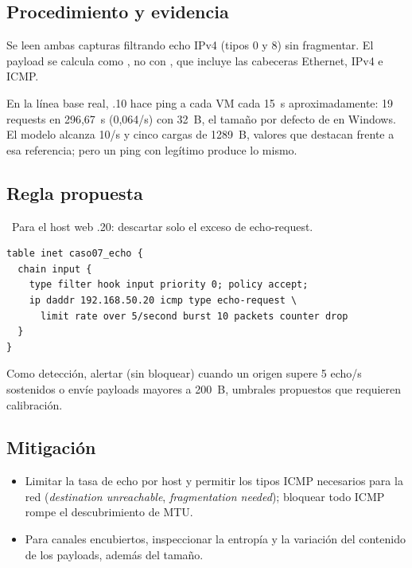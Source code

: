 \subsection{Procedimiento y evidencia}
Se leen ambas capturas filtrando echo IPv4 (tipos 0 y 8) sin fragmentar. El payload se calcula como , no con , que incluye las cabeceras Ethernet, IPv4 e ICMP.


En la línea base real, .10 hace ping a cada VM cada 15~s aproximadamente: 19 requests en 296,67~s (0,064/s) con 32~B, el tamaño por defecto de  en Windows. El modelo alcanza 10/s y cinco cargas de 1289~B, valores que destacan frente a esa referencia; pero un ping con  legítimo produce lo mismo.

\subsection{Regla propuesta}
\PROP\ Para el host web .20: descartar solo el exceso de echo-request.
\begin{lstlisting}
table inet caso07_echo {
  chain input {
    type filter hook input priority 0; policy accept;
    ip daddr 192.168.50.20 icmp type echo-request \
      limit rate over 5/second burst 10 packets counter drop
  }
}
\end{lstlisting}
Como detección, alertar (sin bloquear) cuando un origen supere 5 echo/s sostenidos o envíe payloads mayores a 200~B, umbrales propuestos que requieren calibración.

\subsection{Mitigación}
\begin{itemize}
\item Limitar la tasa de echo por host y permitir los tipos ICMP necesarios para la red (\emph{destination unreachable}, \emph{fragmentation needed}); bloquear todo ICMP rompe el descubrimiento de MTU.
\item Para canales encubiertos, inspeccionar la entropía y la variación del contenido de los payloads, además del tamaño.
\end{itemize}

